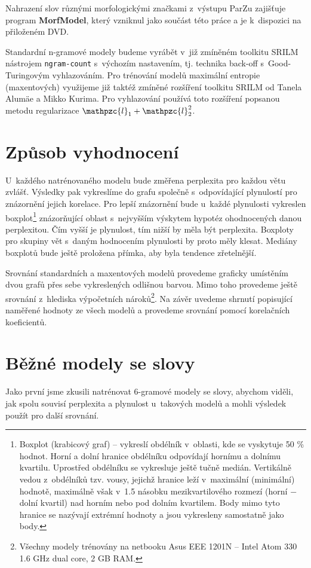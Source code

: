 \documentclass[12pt,a4paper]{report}
\begin{document}
Nahrazení slov různými morfologickými značkami z~výstupu ParZu zajišťuje program \textbf{MorfModel}, který vzniknul jako součást této práce a je k~dispozici na přiloženém DVD. 

Standardní n-gramové modely budeme vyrábět v~již zmíněném toolkitu SRILM nástrojem \texttt{ngram-count} s~výchozím nastavením, tj. technika back-off s~Good-Turingovým vyhlazováním. Pro trénování modelů maximální entropie (maxentových) využijeme již taktéž zmíněné rozšíření toolkitu SRILM od Tanela Alumäe a Mikko Kurima. Pro vyhlazování používá toto rozšíření popsanou metodu regularizace $\mathpzc{l}_1+\mathpzc{l}_2^2$.


\section{Způsob vyhodnocení}
U~každého natrénovaného modelu bude změřena perplexita pro každou větu zvlášť. Výsledky pak vykreslíme do grafu společně s~odpovídající plynulostí pro znázornění jejich korelace. Pro lepší znázornění bude u~každé plynulosti vykreslen box\-plot\footnote{Box\-plot (krabicový graf) -- vykreslí obdélník v~oblasti, kde se vyskytuje 50 \% hodnot. Horní a dolní hranice obdélníku odpovídají hornímu a dolnímu kvartilu. Uprostřed obdélníku se vykresluje ještě tučně medián. Vertikálně vedou z~obdélníků tzv. vousy, jejichž hranice leží v~maximální (minimální) hodnotě, maximálně však v~1.5 násobku mezikvartilového rozmezí (horní $-$ dolní kvartil) nad horním nebo pod dolním kvartilem. Body mimo tyto hranice se nazývají extrémní hodnoty a jsou vykresleny samostatně jako body.} znázorňující oblast s~nejvyšším výskytem hypotéz ohodnocených danou perplexitou. Čím vyšší je plynulost, tím nižší by měla být perplexita. Box\-ploty pro skupiny vět s~daným hodnocením plynulosti by proto měly klesat. Mediány box\-plotů bude ještě proložena přímka, aby byla tendence zřetelnější.

Srovnání standardních a maxentových modelů provedeme graficky umístěním dvou grafů přes sebe vykreslených odlišnou barvou. Mimo toho provedeme ještě srovnání z~hlediska výpočetních nároků\footnote{Všechny modely trénovány na netbooku Asus EEE 1201N -- Intel Atom 330 1.6 GHz dual core, 2 GB RAM.}. Na závěr uvedeme shrnutí popisující naměřené hodnoty ze všech modelů a provedeme srovnání pomocí korelačních koeficientů.

\section{Běžné modely se slovy}
Jako první jsme zkusili natrénovat 6-gramové modely se slovy, abychom viděli, jak spolu souvisí perplexita a plynulost u~takových modelů a mohli výsledek použít pro další srovnání.
\end{document}
